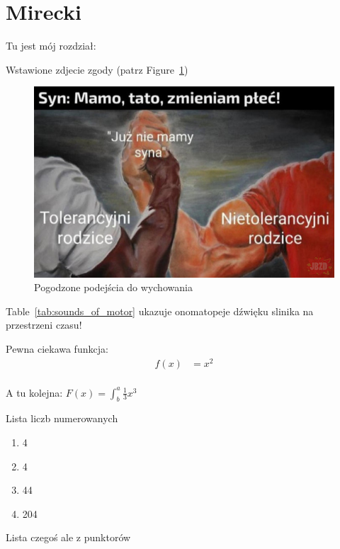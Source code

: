
\section{Mirecki}
\label{sec:mmirecki}

Tu jest mój rozdział: 

\vspace{1cm}


Wstawione zdjecie zgody (patrz Figure~\ref{fig:pogodzenie})

\begin{figure}[htbp]
    \centering
    \includegraphics[width=1\textwidth]{Pictures/1_MM.jpg}
    \caption{Pogodzone podejścia do wychowania}
    \label{fig:pogodzenie}
\end{figure}


Table~\ref{tab:sounds_of_motor} ukazuje onomatopeje dźwięku slinika na przestrzeni czasu!
    



Pewna ciekawa funkcja:
\begin{align*}
  f(x) &= x^2\\
\end{align*}

A tu kolejna:
$   F(x) = \int^a_b \frac{1}{3}x^3 $

\vspace{1cm}

Lista liczb numerowanych
\begin{enumerate}
  \item 4
  \item 4
  \item 44
  \item 204
\end{enumerate}
\vspace{1cm}
Lista czegoś ale z punktorów

